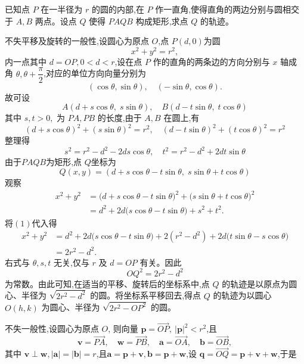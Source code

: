 \begin{questions}
    \question 已知点 $P$ 在一半径为 $r$ 的圆的内部,在 $P$ 作一直角,使得直角的两边分别与圆相交于 $A,B$ 两点。设点 $Q$ 使得 $PAQB$ 构成矩形,求点 $Q$ 的轨迹。
    \begin{solution}
        不失平移及旋转的一般性,设圆心为原点 $O$,点 $P(d,0)$为圆
        \[
        x^2+y^2=r^2,
        \]
        内一点其中 $d=OP,0<d<r$,设在点 $P$ 作的直角的两条边的方向分别与 $x$ 轴成角 $\theta,\theta+\dfrac{\pi}{2}$,对应的单位方向向量分别为
        \[
        (\cos\theta,\sin\theta),\quad(-\sin\theta,\cos\theta).
        \]
        故可设
        \[
        A\left(d+s\cos\theta,\;s\sin\theta\right),\quad B\left(d-t\sin\theta,\;t\cos\theta\right)
        \]
        其中 $s,t>0,$ 为 $PA,PB$ 的长度,由于 $A,B$ 在圆上,有
        \[
        (d+s\cos\theta)^2+(s\sin\theta)^2=r^2,\quad 
        (d-t\sin\theta)^2+(t\cos\theta)^2=r^2
        \]
        整理得
        \[
        s^2=r^2-d^2-2ds\cos\theta,\quad t^2=r^2-d^2+2dt\sin\theta \tag{1}
        \]
        由于$PAQB$为矩形,点 $Q$坐标为
        \[
        Q(x,y)=\left(d+s\cos\theta-t\sin\theta,\;s\sin\theta+t\cos\theta\right)
        \]
        观察
        \begin{align*}
        x^2+y^2
        &=\bigl(d+s\cos\theta-t\sin\theta\bigr)^2+\bigl(s\sin\theta+t\cos\theta\bigr)^2 \\
        &=d^2+2d\bigl(s\cos\theta-t\sin\theta\bigr)+s^2+t^2.
        \end{align*}
        将$(1)$代入得
        \begin{align*}
        x^2+y^2
        &=d^2+2d\bigl(s\cos\theta-t\sin\theta\bigr)
        +2(r^2-d^2)+2d\bigl(t\sin\theta-s\cos\theta\bigr) \\
        &=2r^2-d^2.
        \end{align*}
        右式与 $\theta,s,t$ 无关,仅与 $r$ 及 $d=OP$ 有关。因此
        \[
        OQ^2=2r^2-d^2
        \]
        为常数。由此可知,在适当的平移、旋转后的坐标系中,点 $Q$ 的轨迹是以原点为圆心、半径为 $\sqrt{2r^2-d^2}$ 的圆。将坐标系平移回去,得点 $Q$ 的轨迹为以圆心 $O(h,k)$ 为圆心、半径为 $\sqrt{2r^2-OP^2}$ 的圆。
    \end{solution}
    \begin{solution}
        不失一般性,设圆心为原点 $O$, 则向量 $\mathbf{p}=\overrightarrow{OP},\ |\mathbf{p}|^2<r^2$,且
        \[
        \mathbf{v}=\overrightarrow{PA},\quad \mathbf{w}=\overrightarrow{PB},\quad \mathbf{a}=\overrightarrow{OA},\quad \mathbf{b}=\overrightarrow{OB},
        \]
        其中 $\mathbf{v}\perp\mathbf{w},|\mathbf{a}|=|\mathbf{b}|=r$,且$\mathbf{a}=\mathbf{p}+\mathbf{v},\mathbf{b}=\mathbf{p}+\mathbf{w}$,设 $\mathbf{q}=\overrightarrow{OQ}=\mathbf{p}+\mathbf{v}+\mathbf{w}$,于是

\end{solution}
\end{questions}
